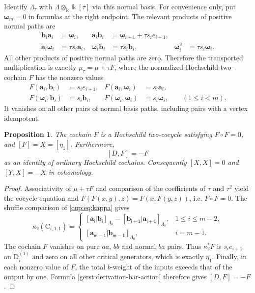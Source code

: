 \documentclass[a4paper,11pt,oneside,reqno]{amsart}
\newtheorem{proposition}[theorem]{Proposition}
\theoremstyle{definition}
\numberwithin{equation}{section}
\begin{document}
Identify $\Lambda_\tau$ with
$\Lambda\otimes_{\Bbbk}\Bbbk[\tau]$ via this normal basis.
For convenience only, put $\boldsymbol\omega_m=0$ in formulas at the
right endpoint.  The relevant products of positive normal paths are
\begin{align}
 \mathbf b_i\mathbf a_i&=\boldsymbol\omega_i,
 &\mathbf a_i\mathbf b_i&=\boldsymbol\omega_{i+1}+\tau s_i e_{i+1},
 \label{gerst:deformed-arrow-products}\\
 \mathbf a_i\boldsymbol\omega_i&=\tau s_i\mathbf a_i,
 &\boldsymbol\omega_i\mathbf b_i&=\tau s_i\mathbf b_i,
 &\boldsymbol\omega_i^2&=\tau s_i\boldsymbol\omega_i.
 \label{gerst:deformed-loop-products}
\end{align}
All other products of positive normal paths are zero.  Therefore the
transported multiplication is exactly $\mu_\tau=\mu+\tau F$, where
the normalized Hochschild two-cochain $F$ has the nonzero values
\begin{equation}\label{gerst:even-bar-representative}
\begin{aligned}
 F(\mathbf a_i,\mathbf b_i)&=s_i e_{i+1},
 &F(\mathbf a_i,\boldsymbol\omega_i)&=s_i\mathbf a_i,\\
 F(\boldsymbol\omega_i,\mathbf b_i)&=s_i\mathbf b_i,
 &F(\boldsymbol\omega_i,\boldsymbol\omega_i)&=s_i\boldsymbol\omega_i,
 \qquad (1\le i<m).
\end{aligned}
\end{equation}
It vanishes on all other pairs of normal basis paths, including
pairs with a vertex idempotent.

\begin{proposition}\label{gerst:even-self-bracket}
The cochain $F$ is a Hochschild two-cocycle satisfying
$F\circ F=0$, and $[F]=X=[\eta_1]$.  Furthermore,
\[
 [D,F]=-F
\]
as an identity of ordinary Hochschild cochains.
Consequently $[X,X]=0$ and $[Y,X]=-X$ in cohomology.
\end{proposition}

\begin{proof}
Associativity of $\mu+\tau F$ and comparison of the coefficients
of $\tau$ and $\tau^2$ yield the cocycle equation and
$F(F(x,y),z)=F(x,F(y,z))$, i.e. $F\circ F=0$.
The shuffle comparison of \eqref{cup:eq:kappa} gives
\begin{equation}\label{gerst:comparison-degree-two}
 \kappa_2(\mathrm C_{i;1,1})=
 \begin{cases}
  \mathsf{[\mathbf a_i|\mathbf b_i]}_{\Lambda_0}
  -\mathsf{[\mathbf b_{i+1}|\mathbf a_{i+1}]}_{\Lambda_0},
  &1\le i\le m-2,\\
  \mathsf{[\mathbf a_{m-1}|\mathbf b_{m-1}]}_{\Lambda_0},
  &i=m-1.
 \end{cases}
\end{equation}
The cochain $F$ vanishes on pure $aa$, $bb$ and normal $ba$
pairs.  Thus $\kappa_2^*F$ is $s_i e_{i+1}$ on
$\mathrm D_i^{(1)}$ and zero on all other critical generators,
which is exactly $\eta_1$.
Finally, in each nonzero value of $F$, the total $b$-weight of the
inputs exceeds that of the output by one.  Formula
\eqref{gerst:derivation-bar-action} therefore gives $[D,F]=-F$.
\end{proof}
\end{document}
